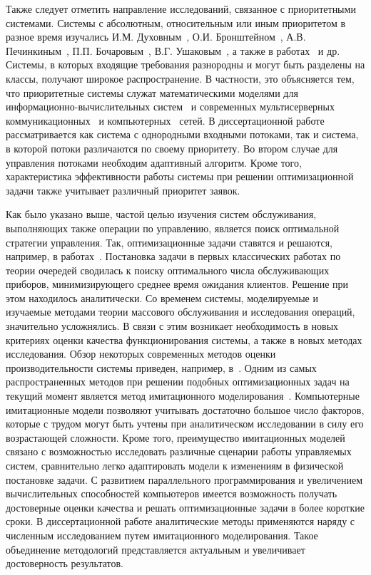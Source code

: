 Также следует отметить направление исследований, связанное с приоритетными системами. Системы с абсолютным, относительным или иным приоритетом в разное время изучались И.М. Духовным~\cite{Duhovny1969}, О.И. Бронштейном~\cite{Bronshtein1971}, А.В. Печинкиным~\cite{Pechinkin1990}, П.П. Бочаровым~\cite{Bocharov1997}, В.Г. Ушаковым~\cite{Ushakov1977,Leontiev2016}, а также в работах~\cite{Volkovinski19891,Volkovinski19892,Mishkoi2008,Ushakov2012} и др. Системы, в которых входящие требования разнородны и могут быть разделены на классы, получают широкое распространение. В частности, это объясняется тем, что приоритетные системы служат математическими моделями для информационно-вычислительных систем~\cite{Bronshtein1976} и современных мультисерверных коммуникационных~\cite{Vishnevski2005} и компьютерных~\cite{Vishnevski2003} сетей. В диссертационной работе рассматривается как система с однородными входными потоками, так и система, в которой потоки различаются по своему приоритету. Во втором случае для управления потоками необходим адаптивный алгоритм. Кроме того, характеристика эффективности работы системы при решении оптимизационной задачи также учитывает различный приоритет заявок.

Как было указано выше, частой целью изучения систем обслуживания, выполняющих также операции по управлению, является поиск оптимальной стратегии управления. Так, оптимизационные задачи ставятся и решаются, например, в работах~\cite{Klimov1966,Kovalenko1968,Kredepcer1970,Lanin1972,Vasilakos1990,Mason1999,Cruz2014,Babicheva2015,Huang2015}. Постановка задачи в первых классических работах по теории очередей сводилась к поиску оптимального числа обслуживающих приборов, минимизирующего среднее время ожидания клиентов. Решение при этом находилось аналитически. Со временем системы, моделируемые и изучаемые методами теории массового обслуживания и исследования операций, значительно усложнялись. В связи с этим возникает необходимость в новых критериях оценки качества функционирования системы, а также в новых методах исследования. Обзор некоторых современных методов оценки производительности системы приведен, например, в~\cite{Cruz2014}. Одним из самых распространенных методов при решении подобных оптимизационных задач на текущий момент является метод имитационного моделирования~\cite{Simulation}. Компьютерные имитационные модели позволяют учитывать достаточно большое число факторов, которые с трудом могут быть учтены при аналитическом исследовании в силу его возрастающей сложности. Кроме того, преимущество имитационных моделей связано с возможностью исследовать различные сценарии работы управляемых систем, сравнительно легко адаптировать модели к изменениям в физической постановке задачи. С развитием параллельного программирования и увеличением вычислительных способностей компьютеров имеется возможность получать достоверные оценки качества и решать оптимизационные задачи в более короткие сроки. В диссертационной работе аналитические методы применяются наряду с численным исследованием путем имитационного моделирования. Такое объединение методологий представляется актуальным и увеличивает достоверность результатов.

